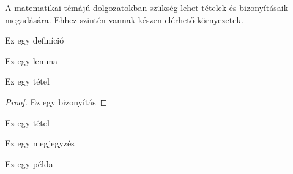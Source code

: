
A matematikai témájú dolgozatokban szükség lehet tételek és bizonyításaik megadására.
Ehhez szintén vannak készen elérhető környezetek.

\begin{definition}
Ez egy definíció
\end{definition}

\begin{lemma}
Ez egy lemma
\end{lemma}

\begin{theorem}
Ez egy tétel
\end{theorem}

\begin{proof}
Ez egy bizonyítás
\end{proof}

\begin{corollary}
Ez egy tétel
\end{corollary}

\begin{remark}
Ez egy megjegyzés
\end{remark}

\begin{example}
Ez egy példa
\end{example}
